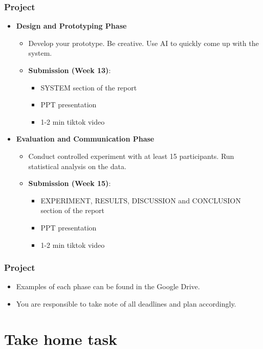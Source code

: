 \documentclass{beamer}
\begin{document}
\begin{frame}
\frametitle{Project}
\footnotesize
\begin{itemize}
	\item \textbf{Design and Prototyping Phase}
	\begin{itemize}
		\item Develop your prototype.   Be creative.  Use AI to quickly come up with the system. 
		\item \textbf{Submission (Week 13)}:
		\begin{itemize}
			\item SYSTEM section of the report
			\item  PPT presentation
            \item 1-2 min tiktok video
		\end{itemize}
	\end{itemize}
	\item \textbf{Evaluation and Communication Phase}
	\begin{itemize}
		\item Conduct controlled experiment with at least 15 participants.  Run statistical analysis on the data.  
		\item \textbf{Submission (Week 15)}:
		\begin{itemize}
			\item  EXPERIMENT, RESULTS, DISCUSSION and CONCLUSION section of the report
			\item  PPT presentation
            \item 1-2 min tiktok video
		\end{itemize}
	\end{itemize}
\end{itemize}
\end{frame}

\begin{frame}
\frametitle{Project}
\begin{itemize}
	\item Examples of each phase can be found in the Google Drive.
	\item You are responsible to take note of all deadlines and plan accordingly.
\end{itemize}
\end{frame}

\section{Take home task}
\end{document}
